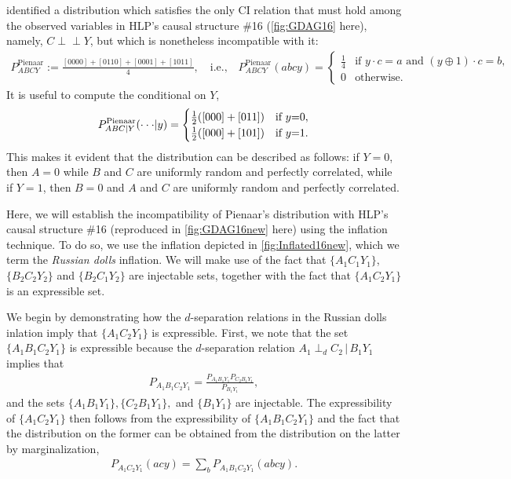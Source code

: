 \documentclass[aps,english,10pt,superscriptaddress,onecolumn,twoside,longbibliography,pra,floatfix,fleqn,nofootinbib]{revtex4-1}
\theoremstyle{definition}
\newcommand{\indep}{\perp\!\!\!\!\perp}
\newcommand{\eql}{\mathord{=}}
\DeclarePairedDelimiter{\parenths}{\lparen}{\rparen}
\begin{document}
\citet{pianaar2016interesting} identified a distribution which satisfies the only CI relation that must hold among the observed variables in  HLP's causal structure \#16 (\cref{fig:GDAG16} here), namely, $C\indep Y$, but which is nonetheless incompatible with it:
\begin{align}\label{eq:pienaardistro}
\!    P^{\text{Pienaar}}_{A B C Y}:=\frac{[0000]+[0110]+[0001]+[1011]}{4},\quad\text{i.e.,}\quad P^{\text{Pienaar}}_{A B C Y}(a b c y)=\begin{cases}\tfrac{1}{4}&\text{if }  y\cdot c = a \text{ and }  (y \oplus 1)\cdot c = b, \\ 0&\text{otherwise}.\end{cases}
\end{align}
It is useful to compute the conditional on $Y$,
\begin{align}\label{eq:pienaardistroconditiona}
  P^{\text{Pienaar}}_{A B C|Y}(\cdot \cdot \cdot | y)=\begin{cases}\frac{1}{2}\parenths{[000]+[011]}&\text{if }  y\eql 0, \\ \frac{1}{2}\parenths{[000]+[101]}&\text{if }  y\eql 1.\end{cases}
\end{align}
This makes it evident that the distribution can be described as follows: if $Y=0$, then $A=0$ while $B$ and $C$ are uniformly random and perfectly correlated, while if $Y=1$, then $B=0$ and $A$ and $C$ are uniformly random and perfectly correlated.

Here, we will establish the incompatibility of Pienaar's distribution with HLP's causal structure \#16 (reproduced in \cref{fig:GDAG16new} here) using the inflation technique.  To do so, we use the inflation
depicted in \cref{fig:Inflated16new}, which we term the {\em Russian dolls} inflation.  
We will make use of the fact that $\{ A_1 C_1 Y_1\}$, $\{ B_2 C_2 Y_2\}$ and $\{B_2 C_1 Y_2 \}$ are injectable sets, together with the fact that $\{ A_1 C_2 Y_1\}$ is an expressible set. 

We begin by demonstrating how the $d$-separation relations in the Russian dolls inlation imply that $\{ A_1 C_2 Y_1\}$ is expressible. 
First, we note that the set $\{ A_1 B_1 C_2 Y_1\}$ is expressible because the $d$-separation relation $A_1 \perp_d C_2\, |\, B_1 Y_1$ implies that
\begin{align}\label{express1}
P_{A_1 B_1 C_2 Y_1} = \frac{P_{A_1 B_1 Y_1} P_{C_2 B_1 Y_1} }{P_{B_1 Y_1}},
\end{align}
and the sets $\{A_1 B_1 Y_1\}, \{C_2 B_1 Y_1\},$ and $\{B_1 Y_1\}$ are injectable.   The expressibility of $\{ A_1 C_2 Y_1\}$ then follows from the expressibility of $\{ A_1 B_1 C_2 Y_1\}$ and the fact that the distribution on the former can be obtained from the distribution on the latter by marginalization,
\begin{align}\label{express0}
P_{A_1 C_2 Y_1}(acy) = \sum_{b} P_{ A_1 B_1 C_2 Y_1}(abcy).
\end{align}
\end{document}
